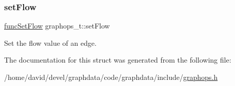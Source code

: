 \subsubsection{\texorpdfstring{set\+Flow}{setFlow}}
{\footnotesize\ttfamily \hyperlink{graphops_8h_a69ba36f21492df6ab16e426fffcf0c47}{func\+Set\+Flow} graphops\+\_\+t\+::set\+Flow}

Set the flow value of an edge. 

The documentation for this struct was generated from the following file\+:\begin{DoxyCompactItemize}
\item 
/home/david/devel/graphdata/code/graphdata/include/\hyperlink{graphops_8h}{graphops.\+h}\end{DoxyCompactItemize}
